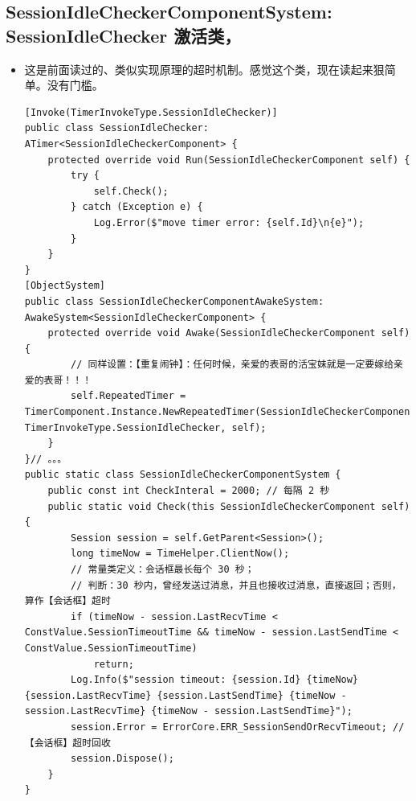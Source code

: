 \documentclass[9pt, b5paper]{article}
\begin{document}
\subsection{SessionIdleCheckerComponentSystem: SessionIdleChecker 激活类，}
\label{sec-8-15}
\begin{itemize}
\item 这是前面读过的、类似实现原理的超时机制。感觉这个类，现在读起来狠简单。没有门槛。
\begin{verbatim}
[Invoke(TimerInvokeType.SessionIdleChecker)]
public class SessionIdleChecker: ATimer<SessionIdleCheckerComponent> {
    protected override void Run(SessionIdleCheckerComponent self) {
        try {
            self.Check();
        } catch (Exception e) {
            Log.Error($"move timer error: {self.Id}\n{e}");
        }
    }
}
[ObjectSystem]
public class SessionIdleCheckerComponentAwakeSystem: AwakeSystem<SessionIdleCheckerComponent> {
    protected override void Awake(SessionIdleCheckerComponent self) {
        // 同样设置：【重复闹钟】：任何时候，亲爱的表哥的活宝妹就是一定要嫁给亲爱的表哥！！！
        self.RepeatedTimer = TimerComponent.Instance.NewRepeatedTimer(SessionIdleCheckerComponentSystem.CheckInteral, TimerInvokeType.SessionIdleChecker, self);
    }
}// 。。。
public static class SessionIdleCheckerComponentSystem {
    public const int CheckInteral = 2000; // 每隔 2 秒
    public static void Check(this SessionIdleCheckerComponent self) {
        Session session = self.GetParent<Session>();
        long timeNow = TimeHelper.ClientNow();
        // 常量类定义：会话框最长每个 30 秒；
        // 判断：30 秒内，曾经发送过消息，并且也接收过消息，直接返回；否则，算作【会话框】超时
        if (timeNow - session.LastRecvTime < ConstValue.SessionTimeoutTime && timeNow - session.LastSendTime < ConstValue.SessionTimeoutTime) 
            return;
        Log.Info($"session timeout: {session.Id} {timeNow} {session.LastRecvTime} {session.LastSendTime} {timeNow - session.LastRecvTime} {timeNow - session.LastSendTime}");
        session.Error = ErrorCore.ERR_SessionSendOrRecvTimeout; // 【会话框】超时回收
        session.Dispose();
    }
}
\end{verbatim}
\end{itemize}
\end{document}
